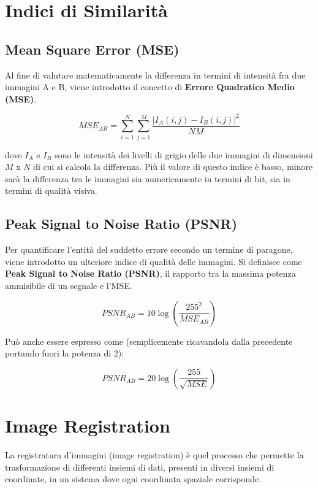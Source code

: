 \chapter{Indici di Similarità}

\section{Mean Square Error (MSE)}

Al fine di valutare matematicamente la differenza in termini di intensità fra due immagini A e B, viene introdotto il concetto di
\textbf{Errore Quadratico Medio (MSE)}.

$$
    MSE_{AB} = \sum_{i=1}^{N}\sum_{j=1}^{M}\frac{|I_A(i,j)-I_B(i,j)|^2}{NM}
$$

dove $I_A$ e $I_B$ sono le intensità dei livelli di grigio delle due immagini di dimensioni $M$ x $N$ di cui si calcola la differenza. Più il valore di questo indice è basso, minore sarà la differenza tra
le immagini sia numericamente in termini di bit, sia in termini di qualità visiva.

\section{Peak Signal to Noise Ratio (PSNR)}

Per quantificare l'entità del suddetto errore secondo un termine di paragone, viene introdotto un ulteriore indice di qualità delle
immagini. Si definisce come \textbf{Peak Signal to Noise Ratio (PSNR)}, il rapporto
tra la massima potenza ammisibile di un segnale e l'MSE.

$$
    PSNR_{AB} = 10 \log(\frac{255^2}{MSE_{AB}})
$$

Può anche essere espresso come (semplicemente ricavandola dalla precedente
portando fuori la potenza di 2):

$$
    PSNR_{AB} = 20 \log(\frac{255}{\sqrt{MSE}})
$$

\chapter{Image Registration}

\begin{definition}
    La registratura d'immagini (image registration) è quel processo che permette la trasformazione di differenti insiemi di dati, presenti in diversi insiemi di coordinate, in un sistema dove ogni coordinata
    spaziale corrisponde.
\end{definition}

